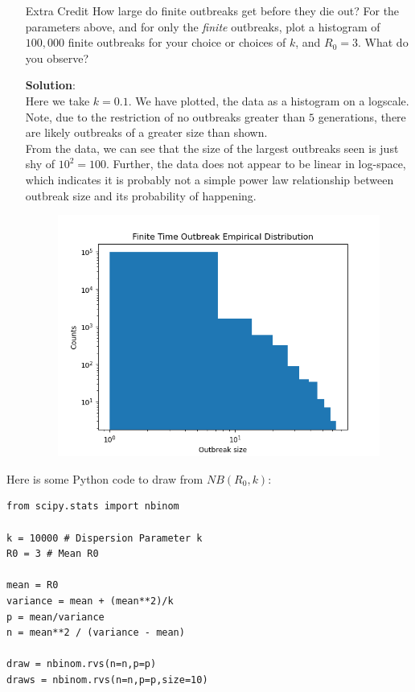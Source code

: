 \documentclass[11pt]{article}
\begin{document}
\begin{enumerate}
\begin{enumerate}[label=\alph*.]
\begin{tcolorbox}[breakable]
	\end{tcolorbox}
	
	\item [Extra Credit] How large do finite outbreaks get before they die out? For the parameters above, and for only the {\it finite} outbreaks, plot a histogram of $100,000$ finite outbreaks for your choice or choices of $k$, and $R_0=3$. What do you observe? 
	
	\begin{tcolorbox}[breakable]
		\textbf{Solution}:\\
		Here we take $k=0.1$. We have plotted, the data as a histogram on a logscale. Note, due to the restriction of no outbreaks greater than $5$ generations, there are likely outbreaks of a greater size than shown. \\
		From the data, we can see that the size of the largest outbreaks seen is just shy of $10^2=100$. Further, the data does not appear to be linear in log-space, which indicates it is probably not a simple power law relationship between outbreak size and its probability of happening.
	\end{tcolorbox}
	\begin{figure}
		\centering
		\includegraphics[scale=0.7]{problem3ec.png}
	\end{figure}

	
\end{enumerate}

\clearpage
Here is some Python code to draw from $NB(R_0, k)$:
\begin{verbatim}
from scipy.stats import nbinom

k = 10000 # Dispersion Parameter k
R0 = 3 # Mean R0

mean = R0
variance = mean + (mean**2)/k
p = mean/variance
n = mean**2 / (variance - mean) 

draw = nbinom.rvs(n=n,p=p)
draws = nbinom.rvs(n=n,p=p,size=10)
\end{verbatim}



\end{enumerate}
\end{document}
